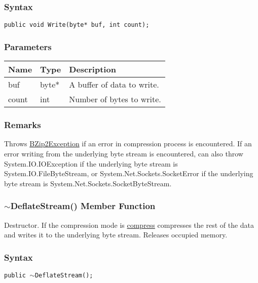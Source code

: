 \documentclass[a4paper,oneside,11.000000pt]{book}
\begin{document}
\subsubsection*{Syntax}\texttt{public void Write(byte* buf, int count);}

\subsubsection*{Parameters}
\begin{flushleft}
\begin{supertabular}[l]{lll}
\textbf{Name}
& \textbf{Type}
& \textbf{Description}
\\
\hline
buf
& byte*
& A buffer of data to write.

\\
count
& int
& Number of bytes to write.

\\
\end{supertabular}

\end{flushleft}
\subsubsection*{Remarks}
\begin{flushleft}
Throws \hyperlink{System.IO.Compression.BZip2Exception}{BZip2Exception} if an error in compression process is encountered.
If an error writing from the underlying byte stream is encountered, 
can also throw System.\-IO.\-IOException if the underlying byte stream is System.\-IO.\-FileByteStream, or
System.\-Net.\-Sockets.\-SocketError if the underlying byte stream is System.\-Net.\-Sockets.\-SocketByteStream.

\end{flushleft}
\clearpage

\hypertarget{System.IO.Compression.DeflateStream.destructor.P.System.IO.Compression.DeflateStream}{\subsubsection*{$\sim$DeflateStream() Member Function}}
\begin{flushleft}
Destructor. If the compression mode is \hyperlink{System.IO.Compression.CompressionMode.compress}{compress} compresses the rest of the data
and writes it to the underlying byte stream. Releases occupied memory.

\end{flushleft}
\subsubsection*{Syntax}\texttt{public $\sim$DeflateStream();}
\clearpage
\end{document}
